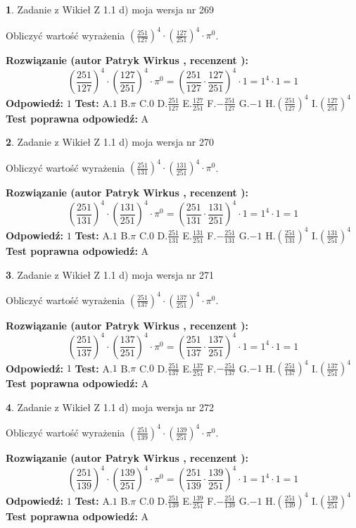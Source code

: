 \documentclass[12pt, a4paper]{article}
\theoremstyle{definition} %
\newtheorem{zad}{}
\newcommand{\zadStart}[1]{\begin{zad}#1\newline}
\newcommand{\zadStop}{\end{zad}}
\newcommand{\rozwStart}[2]{\noindent \textbf{Rozwiązanie (autor #1 , recenzent #2): }\newline}
\newcommand{\rozwStop}{\newline}
\newcommand{\odpStart}{\noindent \textbf{Odpowiedź:}\newline}
\newcommand{\odpStop}{\newline}
\newcommand{\testStart}{\noindent \textbf{Test:}\newline}
\newcommand{\testStop}{\newline}
\newcommand{\kluczStart}{\noindent \textbf{Test poprawna odpowiedź:}\newline}
\newcommand{\kluczStop}{\newline}
\begin{document}
\zadStart{Zadanie z Wikieł Z 1.1 d) moja wersja nr 269}

Obliczyć wartość wyrażenia $(\frac{251}{127})^{4} \cdot (\frac{127}{251})^{4} \cdot \pi^{0}$.
\zadStop
\rozwStart{Patryk Wirkus}{}
$$(\frac{251}{127})^{4} \cdot (\frac{127}{251})^{4} \cdot \pi^{0} = (\frac{251}{127} \cdot \frac{127}{251})^{4} \cdot 1 = 1^{4} \cdot 1 = 1$$
\rozwStop
\odpStart
$1$
\odpStop
\testStart
A.$1$ B.$\pi$ C.$0$ D.$\frac{251}{127}$ E.$\frac{127}{251}$
F.$-\frac{251}{127}$ G.$-1$
H.$(\frac{251}{127})^{4}$
I.$(\frac{127}{251})^{4}$
\testStop
\kluczStart
A
\kluczStop



\zadStart{Zadanie z Wikieł Z 1.1 d) moja wersja nr 270}

Obliczyć wartość wyrażenia $(\frac{251}{131})^{4} \cdot (\frac{131}{251})^{4} \cdot \pi^{0}$.
\zadStop
\rozwStart{Patryk Wirkus}{}
$$(\frac{251}{131})^{4} \cdot (\frac{131}{251})^{4} \cdot \pi^{0} = (\frac{251}{131} \cdot \frac{131}{251})^{4} \cdot 1 = 1^{4} \cdot 1 = 1$$
\rozwStop
\odpStart
$1$
\odpStop
\testStart
A.$1$ B.$\pi$ C.$0$ D.$\frac{251}{131}$ E.$\frac{131}{251}$
F.$-\frac{251}{131}$ G.$-1$
H.$(\frac{251}{131})^{4}$
I.$(\frac{131}{251})^{4}$
\testStop
\kluczStart
A
\kluczStop



\zadStart{Zadanie z Wikieł Z 1.1 d) moja wersja nr 271}

Obliczyć wartość wyrażenia $(\frac{251}{137})^{4} \cdot (\frac{137}{251})^{4} \cdot \pi^{0}$.
\zadStop
\rozwStart{Patryk Wirkus}{}
$$(\frac{251}{137})^{4} \cdot (\frac{137}{251})^{4} \cdot \pi^{0} = (\frac{251}{137} \cdot \frac{137}{251})^{4} \cdot 1 = 1^{4} \cdot 1 = 1$$
\rozwStop
\odpStart
$1$
\odpStop
\testStart
A.$1$ B.$\pi$ C.$0$ D.$\frac{251}{137}$ E.$\frac{137}{251}$
F.$-\frac{251}{137}$ G.$-1$
H.$(\frac{251}{137})^{4}$
I.$(\frac{137}{251})^{4}$
\testStop
\kluczStart
A
\kluczStop



\zadStart{Zadanie z Wikieł Z 1.1 d) moja wersja nr 272}

Obliczyć wartość wyrażenia $(\frac{251}{139})^{4} \cdot (\frac{139}{251})^{4} \cdot \pi^{0}$.
\zadStop
\rozwStart{Patryk Wirkus}{}
$$(\frac{251}{139})^{4} \cdot (\frac{139}{251})^{4} \cdot \pi^{0} = (\frac{251}{139} \cdot \frac{139}{251})^{4} \cdot 1 = 1^{4} \cdot 1 = 1$$
\rozwStop
\odpStart
$1$
\odpStop
\testStart
A.$1$ B.$\pi$ C.$0$ D.$\frac{251}{139}$ E.$\frac{139}{251}$
F.$-\frac{251}{139}$ G.$-1$
H.$(\frac{251}{139})^{4}$
I.$(\frac{139}{251})^{4}$
\testStop
\kluczStart
A
\kluczStop
\end{document}
